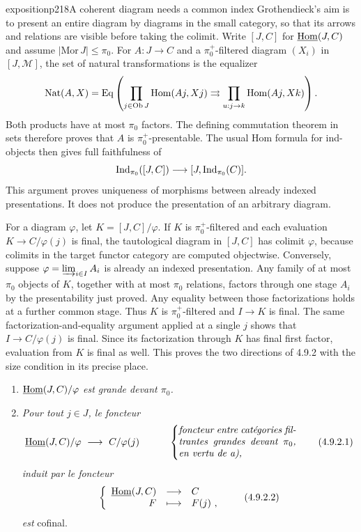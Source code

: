 
\begin{dcomment}{exposition}{p218}{A coherent diagram needs a common index}
Grothendieck's aim is to present an entire diagram by diagrams in the small category, so that its arrows and relations are visible before taking the colimit. Write $[J,C]$ for $\underline{\operatorname{Hom}}(J,C)$ and assume $|\mathrm{Mor}\,J|\leq\pi_0$. For $A:J\to C$ and a $\pi_0^+$-filtered diagram $(X_i)$ in $[J,\mathcal M]$, the set of natural transformations is the equalizer
\[
 \operatorname{Nat}(A,X)=
 \operatorname{Eq}\left(
 \prod_{j\in\operatorname{Ob} J}\operatorname{Hom}(Aj,Xj)
 \rightrightarrows
 \prod_{u:j\to k}\operatorname{Hom}(Aj,Xk)\right).
\]
Both products have at most $\pi_0$ factors. The defining commutation theorem in sets therefore proves that $A$ is $\pi_0^+$-presentable. The usual Hom formula for ind-objects then gives full faithfulness of
\[
 \operatorname{Ind}_{\pi_0}([J,C])\longrightarrow[J,\operatorname{Ind}_{\pi_0}(C)].
\]
This argument proves uniqueness of morphisms between already indexed presentations. It does not produce the presentation of an arbitrary diagram.

For a diagram $\varphi$, let $K=[J,C]/\varphi$. If $K$ is $\pi_0^+$-filtered and each evaluation $K\to C/\varphi(j)$ is final, the tautological diagram in $[J,C]$ has colimit $\varphi$, because colimits in the target functor category are computed objectwise. Conversely, suppose $\varphi=\varinjlim_{i\in I}A_i$ is already an indexed presentation. Any family of at most $\pi_0$ objects of $K$, together with at most $\pi_0$ relations, factors through one stage $A_i$ by the presentability just proved. Any equality between those factorizations holds at a further common stage. Thus $K$ is $\pi_0^+$-filtered and $I\to K$ is final. The same factorization-and-equality argument applied at a single $j$ shows that $I\to C/\varphi(j)$ is final. Since its factorization through $K$ has final first factor, evaluation from $K$ is final as well. This proves the two directions of 4.9.2 with the size condition in its precise place.
\end{dcomment}


\begin{enumerate}[leftmargin=*]
\item[\textit{a)}] $\underline{\operatorname{Hom}}(J, C)/\varphi$ \textit{est grande devant $\pi_0$.}
\item[\textit{b)}] \textit{Pour tout $j \in J$, le foncteur}
\[
\uHom(J, C)/\varphi \ \longrightarrow\ C/\varphi(j) \qquad\quad
\left\{
\parbox{0.35\textwidth}{\textit{foncteur entre catégories filtrantes grandes devant $\pi_0$, en vertu de a),}}
\right. \tag*{(4.9.2.1)}
\]
\textit{induit par le foncteur}
\[
\left\{
\begin{array}{rcl}
\underline{\operatorname{Hom}}(J, C) & \longrightarrow & C \\
F & \longmapsto & F(j)\ ,
\end{array}
\right. \tag*{(4.9.2.2)}
\]
\textit{est} cofinal.
\end{enumerate}

